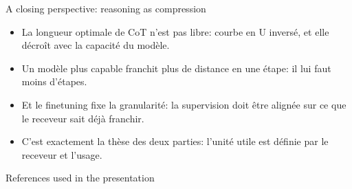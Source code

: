 \documentclass[aspectratio=169,10pt]{beamer}
\begin{document}
\begin{frame}{A closing perspective: reasoning as compression}
{\begin{itemize}
  \item La longueur optimale de CoT n'est pas libre: courbe en U inversé, et elle décroît avec la capacité du modèle.
  \item Un modèle plus capable franchit plus de distance en une étape: il lui faut moins d'étapes.
  \item Et le finetuning fixe la granularité: la supervision doit être alignée sur ce que le receveur sait déjà franchir.
  \item C'est exactement la thèse des deux parties: l'unité utile est définie par le receveur et l'usage.
\end{itemize}}
\end{frame}

\begin{frame}[allowframebreaks]{References used in the presentation}
\printbibliography[heading=none]
\end{frame}

\appendix
\end{document}
